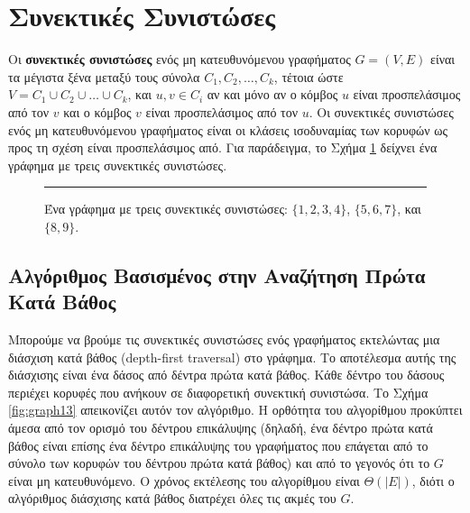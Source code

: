 \documentclass[12pt,a4paper]{article}
\begin{document}
\section{Συνεκτικές Συνιστώσες}

Οι \textbf{συνεκτικές συνιστώσες} ενός μη κατευθυνόμενου γραφήματος $G = (V, E)$
είναι τα μέγιστα ξένα μεταξύ τους σύνολα $C_1, C_2, \ldots, C_k$, τέτοια ώστε
$V = C_1 \cup C_2 \cup \ldots \cup C_k$, και $u, v \in C_i$ αν και μόνο αν ο
κόμβος $u$ είναι προσπελάσιμος από τον $v$ και ο κόμβος $v$ είναι
προσπελάσιμος από τον $u$. Οι συνεκτικές συνιστώσες ενός μη κατευθυνόμενου
γραφήματος είναι οι κλάσεις ισοδυναμίας των κορυφών ως προς τη σχέση
\guillemotleft είναι προσπελάσιμος από\guillemotright. Για παράδειγμα, το Σχήμα \ref{fig:graph12} δείχνει ένα
γράφημα με τρεις συνεκτικές συνιστώσες.

\begin{figure}[H]
\centering
{}
\vspace{0.3cm}
\noindent\rule{\textwidth}{0.2pt}
\caption{Ένα γράφημα με τρεις συνεκτικές συνιστώσες:
$\{1,2,3,4\}$, $\{5,6,7\}$, και $\{8,9\}$.}
\label{fig:graph12}
\end{figure}

\subsection{Αλγόριθμος Βασισμένος στην Αναζήτηση Πρώτα Κατά Βάθος}

Μπορούμε να βρούμε τις συνεκτικές συνιστώσες ενός γραφήματος εκτελώντας μια
διάσχιση κατά βάθος (\foreignlanguage{english}{depth-first traversal}) στο γράφημα. Το αποτέλεσμα αυτής
της διάσχισης είναι ένα δάσος από δέντρα πρώτα κατά βάθος.
Κάθε δέντρο του δάσους περιέχει κορυφές που ανήκουν σε διαφορετική
συνεκτική συνιστώσα. Το Σχήμα \ref{fig:graph13} απεικονίζει αυτόν τον αλγόριθμο.
Η ορθότητα του αλγορίθμου προκύπτει άμεσα από τον ορισμό του
δέντρου επικάλυψης (δηλαδή, ένα δέντρο πρώτα κατά βάθος είναι επίσης ένα
δέντρο επικάλυψης του γραφήματος που επάγεται από το σύνολο των κορυφών του
δέντρου πρώτα κατά βάθος) και από το γεγονός ότι το $G$ είναι μη κατευθυνόμενο.
Ο χρόνος εκτέλεσης του αλγορίθμου είναι $\Theta(|E|)$, διότι ο αλγόριθμος διάσχισης
κατά βάθος διατρέχει όλες τις ακμές του $G$.
\end{document}
